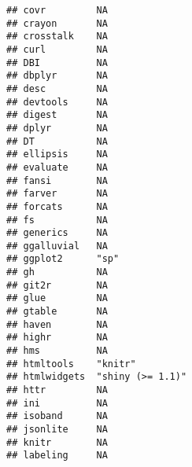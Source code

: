 \documentclass[]{book}
\begin{document}
\begin{verbatim}
## covr         NA                                                        
## crayon       NA                                                        
## crosstalk    NA                                                        
## curl         NA                                                        
## DBI          NA                                                        
## dbplyr       NA                                                        
## desc         NA                                                        
## devtools     NA                                                        
## digest       NA                                                        
## dplyr        NA                                                        
## DT           NA                                                        
## ellipsis     NA                                                        
## evaluate     NA                                                        
## fansi        NA                                                        
## farver       NA                                                        
## forcats      NA                                                        
## fs           NA                                                        
## generics     NA                                                        
## ggalluvial   NA                                                        
## ggplot2      "sp"                                                      
## gh           NA                                                        
## git2r        NA                                                        
## glue         NA                                                        
## gtable       NA                                                        
## haven        NA                                                        
## highr        NA                                                        
## hms          NA                                                        
## htmltools    "knitr"                                                   
## htmlwidgets  "shiny (>= 1.1)"                                          
## httr         NA                                                        
## ini          NA                                                        
## isoband      NA                                                        
## jsonlite     NA                                                        
## knitr        NA                                                        
## labeling     NA                                                        

\end{verbatim}
\end{document}
